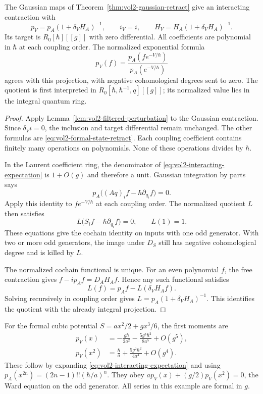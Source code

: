 \begin{theorem}\label{thm:vol2-formal-state-retract}
The Gaussian maps of Theorem~\ref{thm:vol2-gaussian-retract}
give an interacting contraction with
\begin{equation}\label{eq:vol2-formal-state-retract}
 p_V=p_A(1+\delta_VH_A)^{-1},\qquad
 i_V=i,\qquad
 H_V=H_A(1+\delta_VH_A)^{-1}.
\end{equation}
Its target is $R_0[\hbar][[g]]$ with zero differential.
All coefficients are polynomial in $\hbar$ at each coupling
order. The normalized exponential formula
\begin{equation}\label{eq:vol2-interacting-expectation}
 p_V(f)=\frac{p_A(fe^{-V/\hbar})}{p_A(e^{-V/\hbar})}
\end{equation}
agrees with this projection, with negative cohomological degrees
sent to zero. The quotient is first interpreted in
$R_0[\hbar,\hbar^{-1},q][[g]]$; its normalized value lies in
the integral quantum ring.
\end{theorem}
\begin{proof}
Apply Lemma~\ref{lem:vol2-filtered-perturbation} to the
Gaussian contraction. Since $\delta_Vi=0$, the inclusion and
target differential remain unchanged. The other formulas are
\eqref{eq:vol2-formal-state-retract}. Each coupling coefficient
contains finitely many operations on polynomials. None of these
operations divides by $\hbar$.

In the Laurent coefficient ring, the denominator of
\eqref{eq:vol2-interacting-expectation} is $1+O(g)$ and
therefore a unit. Gaussian integration by parts says
\[
 p_A\bigl((Aq)_if-\hbar\partial_{q_i}f\bigr)=0.
\]
Apply this identity to $fe^{-V/\hbar}$ at each coupling order.
The normalized quotient $L$ then satisfies
\[
 L\bigl(S_if-\hbar\partial_{q_i}f\bigr)=0,
 \qquad L(1)=1.
\]
These equations give the cochain identity on inputs with
one odd generator. With two or more odd generators,
the image under $D_S$ still has negative cohomological degree
and is killed by $L$.

The normalized cochain functional is unique. For an even
polynomial $f$, the free contraction gives
$f-ip_Af=D_AH_Af$. Hence any such functional satisfies
\[
 L(f)=p_Af-L(\delta_VH_Af).
\]
Solving recursively in coupling order gives
$L=p_A(1+\delta_VH_A)^{-1}$. This identifies the quotient
with the already integral projection.
\end{proof}

For the formal cubic potential $S=ax^2/2+gx^3/6$, the first
moments are
\begin{equation}\label{eq:vol2-cubic-state-moments}
 \begin{aligned}
 p_V(x)&=-\frac{g\hbar}{2a^2}
             -\frac{5g^3\hbar^2}{8a^5}+O(g^5),\\
 p_V(x^2)&=\frac{\hbar}{a}
             +\frac{5g^2\hbar^2}{4a^4}+O(g^4).
 \end{aligned}
\end{equation}
These follow by expanding \eqref{eq:vol2-interacting-expectation}
and using $p_A(x^{2n})=(2n-1)!!(\hbar/a)^n$.
They obey $a p_V(x)+(g/2)p_V(x^2)=0$, the Ward equation on
the odd generator. All series in this example are formal in $g$.

